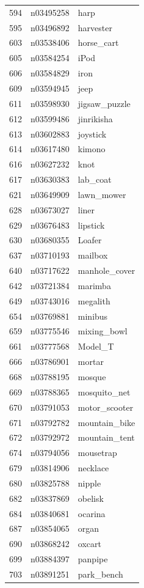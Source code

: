 \begin{table}
\begin{tabular}{cll}
594 & n03495258 & harp \\
595 & n03496892 & harvester \\
603 & n03538406 & horse_cart \\
605 & n03584254 & iPod \\
606 & n03584829 & iron \\
609 & n03594945 & jeep \\
611 & n03598930 & jigsaw_puzzle \\
612 & n03599486 & jinrikisha \\
613 & n03602883 & joystick \\
614 & n03617480 & kimono \\
616 & n03627232 & knot \\
617 & n03630383 & lab_coat \\
621 & n03649909 & lawn_mower \\
628 & n03673027 & liner \\
629 & n03676483 & lipstick \\
630 & n03680355 & Loafer \\
637 & n03710193 & mailbox \\
640 & n03717622 & manhole_cover \\
642 & n03721384 & marimba \\
649 & n03743016 & megalith \\
654 & n03769881 & minibus \\
659 & n03775546 & mixing_bowl \\
661 & n03777568 & Model_T \\
666 & n03786901 & mortar \\
668 & n03788195 & mosque \\
669 & n03788365 & mosquito_net \\
670 & n03791053 & motor_scooter \\
671 & n03792782 & mountain_bike \\
672 & n03792972 & mountain_tent \\
674 & n03794056 & mousetrap \\
679 & n03814906 & necklace \\
680 & n03825788 & nipple \\
682 & n03837869 & obelisk \\
684 & n03840681 & ocarina \\
687 & n03854065 & organ \\
690 & n03868242 & oxcart \\
699 & n03884397 & panpipe \\
703 & n03891251 & park_bench \\

\end{tabular}
\end{table}
